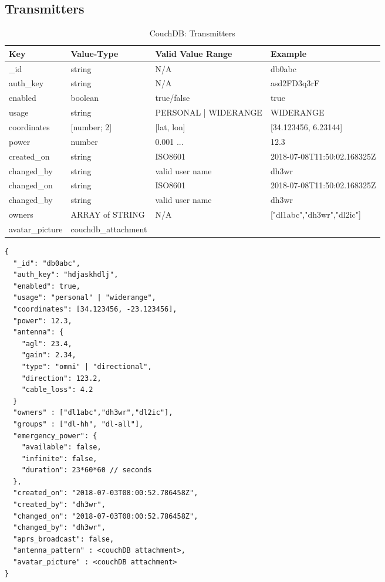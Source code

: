 \subsection{Transmitters}
\begin{table}[h]
 \caption{CouchDB: Transmitters}
 \begin{tabular}{|l|l|l|l|}\hline
  Key & Value-Type & Valid Value Range & Example \\
  \hline
  \_id & string & N/A & db0abc \\
  auth\_key & string & N/A & asd2FD3q3rF \\
  enabled & boolean & true/false & true \\
  usage & string & PERSONAL | WIDERANGE & WIDERANGE \\
  coordinates & [number; 2]  & [lat, lon] & [34.123456, 6.23144] \\
  power & number & 0.001 ...  & 12.3 \\
  created\_on & string & ISO8601 & 2018-07-08T11:50:02.168325Z \\
  changed\_by & string & valid user name & dh3wr \\
  changed\_on & string & ISO8601 & 2018-07-08T11:50:02.168325Z \\
  changed\_by & string & valid user name & dh3wr \\
  owners & ARRAY of STRING & N/A & ["dl1abc","dh3wr","dl2ic"] \\
  avatar\_picture & couchdb\_attachment & & \\ \hline
  \end{tabular}
  \label{tab:couchdb:transmitters}
\end{table}

\begin{lstlisting}
{
  "_id": "db0abc",
  "auth_key": "hdjaskhdlj",
  "enabled": true,
  "usage": "personal" | "widerange",
  "coordinates": [34.123456, -23.123456],
  "power": 12.3,
  "antenna": {
    "agl": 23.4,
    "gain": 2.34,
    "type": "omni" | "directional",
    "direction": 123.2,
    "cable_loss": 4.2
  }
  "owners" : ["dl1abc","dh3wr","dl2ic"],
  "groups" : ["dl-hh", "dl-all"],
  "emergency_power": {
    "available": false,
    "infinite": false,
    "duration": 23*60*60 // seconds
  },
  "created_on": "2018-07-03T08:00:52.786458Z",
  "created_by": "dh3wr",
  "changed_on": "2018-07-03T08:00:52.786458Z",
  "changed_by": "dh3wr",
  "aprs_broadcast": false,
  "antenna_pattern" : <couchDB attachment>,
  "avatar_picture" : <couchDB attachment>
}
\end{lstlisting}


